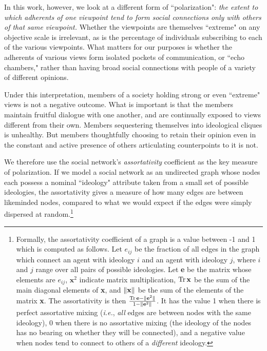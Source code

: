 In this work, however, we look at a different form of ``polarization":
\textit{the extent to which adherents of one viewpoint tend to form social
connections only with others of that same viewpoint.} Whether the viewpoints
are themselves ``extreme" on any objective scale is irrelevant, as is the
percentage of individuals subscribing to each of the various viewpoints. What
matters for our purposes is whether the adherents of various views form
isolated pockets of communication, or ``echo chambers," rather than having
broad social connections with people of a variety of different opinions.

Under this interpretation, members of a society holding strong or even
``extreme" views is not a negative outcome. What is important is that the
members maintain fruitful dialogue with one another, and are continually
exposed to views different from their own. Members sequestering themselves
into ideological cliques is unhealthy. But members thoughtfully choosing
to retain their opinion even in the constant and active presence of others
articulating counterpoints to it is not.

We therefore use the social network's \textit{assortativity}
coefficient\cite{newman_mixing_2003} as the key measure of polarization. If we
model a social network as an undirected graph whose nodes each possess a
nominal ``ideology" attribute taken from a small set of possible ideologies,
the assortativity gives a measure of how many edges are between likeminded
nodes, compared to what we would expect if the edges were simply dispersed at
random.\footnote{Formally, the assortativity coefficient of a graph is a value
between -1 and 1 which is computed as follows. Let $e_{ij}$ be the fraction of
all edges in the graph which connect an agent with ideology $i$ and an agent
with ideology $j$, where $i$ and $j$ range over all pairs of possible
ideologies. Let \textbf{e} be the matrix whose elements are $e_{ij}$,
$\textbf{x}^2$ indicate matrix multiplication, $\operatorname{Tr} \textbf{x}$ be the sum of
the main diagonal elements of \textbf{x}, and $\lVert\textbf{x}\rVert$ be the sum
of the elements of the matrix \textbf{x}. The assortativity is then $\frac{\operatorname{Tr}
\textbf{e} - \lVert\textbf{e}^2\rVert}{1 - \lVert\textbf{e}^2\rVert}$. It has the value
1 when there is perfect assortative mixing (\textit{i.e.}, \textit{all} edges
are between nodes with the same ideology), 0 when there is no assortative
mixing (the ideology of the nodes has no bearing on whether they will be
connected), and a negative value when nodes tend to connect to others of a
\textit{different} ideology.}


